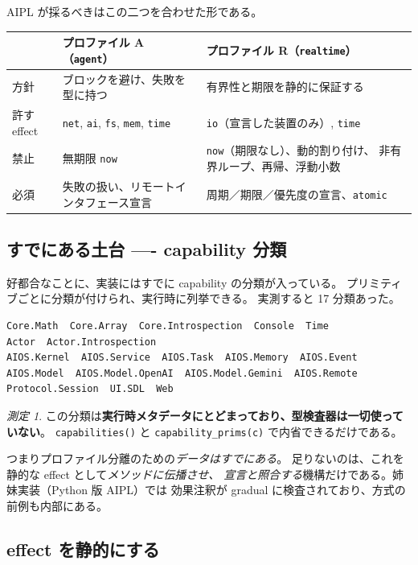 \documentclass[11pt,a4paper]{ltjsarticle}
\theoremstyle{remark}
\newtheorem{finding}{測定}
\begin{document}
AIPL が採るべきはこの二つを合わせた形である。

\begin{center}
\small
\begin{tabular}{@{}lp{5.0cm}p{5.0cm}@{}}
\toprule
 & プロファイル A（\texttt{agent}） & プロファイル R（\texttt{realtime}） \\
\midrule
方針 & ブロックを避け、失敗を型に持つ &
  有界性と期限を静的に保証する \\
許す effect & \texttt{net}, \texttt{ai}, \texttt{fs}, \texttt{mem},
  \texttt{time} & \texttt{io}（宣言した装置のみ）, \texttt{time} \\
禁止 & 無期限 \texttt{now} & \texttt{now}（期限なし）、動的割り付け、
  非有界ループ、再帰、浮動小数 \\
必須 & 失敗の扱い、リモートインタフェース宣言 &
  周期／期限／優先度の宣言、\texttt{atomic} \\
\bottomrule
\end{tabular}
\end{center}

\subsection{すでにある土台 ---- capability 分類}

好都合なことに、実装にはすでに capability の分類が入っている。
プリミティブごとに分類が付けられ、実行時に列挙できる。
実測すると 17 分類あった。

\begin{lstlisting}[language={}]
Core.Math  Core.Array  Core.Introspection  Console  Time
Actor  Actor.Introspection
AIOS.Kernel  AIOS.Service  AIOS.Task  AIOS.Memory  AIOS.Event
AIOS.Model  AIOS.Model.OpenAI  AIOS.Model.Gemini  AIOS.Remote
Protocol.Session  UI.SDL  Web
\end{lstlisting}

\begin{finding}
この分類は\textbf{実行時メタデータにとどまっており、型検査器は一切使っていない}。
\texttt{capabilities()} と \texttt{capability\_prims(c)} で内省できるだけである。
\end{finding}

つまりプロファイル分離のための\emph{データはすでにある}。
足りないのは、これを静的な effect として\emph{メソッドに伝播させ、
宣言と照合する}機構だけである。姉妹実装（Python 版 AIPL）では
効果注釈が gradual に検査されており、方式の前例も内部にある。

\subsection{effect を静的にする}
\end{document}
